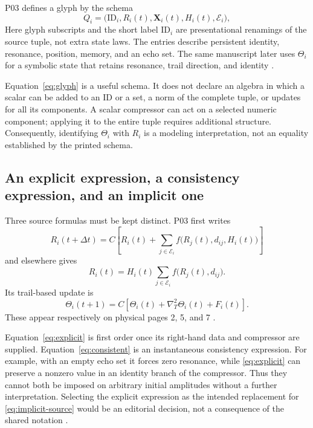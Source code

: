 \documentclass[11pt,a4paper]{article}
\theoremstyle{definition}
\numberwithin{equation}{section}
\begin{document}
P03 defines a glyph by the schema
\begin{equation}
 Q_i=\bigl(\mathrm{ID}_i,R_i(t),\mathbf X_i(t),H_i(t),\mathcal E_i\bigr),
 \label{eq:glyph}
\end{equation}
Here glyph subscripts and the short label $\mathrm{ID}_i$ are presentational
renamings of the source tuple, not extra state laws. The entries describe
persistent identity, resonance, position, memory,
and an echo set. The same manuscript later uses $\Theta_i$ for a symbolic
state that retains resonance, trail direction, and identity
\cite[physical pp.~2,18]{P03}.

Equation~\eqref{eq:glyph} is a useful schema. It does not declare an algebra
in which a scalar can be added to an ID or a set, a norm of the complete tuple,
or updates for all its components. A scalar compressor can act on a selected
numeric component; applying it to the entire tuple requires additional
structure. Consequently, identifying $\Theta_i$ with $R_i$ is a modeling
interpretation, not an equality established by the printed schema.

\subsection{An explicit expression, a consistency expression, and an implicit one}

Three source formulas must be kept distinct. P03 first writes
\begin{equation}
 R_i(t+\Delta t)=C\!\left[R_i(t)+
 \sum_{j\in\mathcal E_i}f\bigl(R_j(t),d_{ij},H_i(t)\bigr)\right]
 \label{eq:explicit}
\end{equation}
and elsewhere gives
\begin{equation}
 R_i(t)=H_i(t)\sum_{j\in\mathcal E_i}f\bigl(R_j(t),d_{ij}\bigr).
 \label{eq:consistent}
\end{equation}
Its trail-based update is
\begin{equation}
 \Theta_i(t+1)=C\!\left[
 \Theta_i(t)+\nabla_T^2\Theta_i(t)+F_i(t)\right].
 \label{eq:implicit-source}
\end{equation}
These appear respectively on physical pages 2, 5, and 7
\cite[\S\S1.1,2.2,3.1]{P03}.

Equation~\eqref{eq:explicit} is first order once its right-hand data and
compressor are supplied. Equation~\eqref{eq:consistent} is an instantaneous
consistency expression. For example, with an empty echo set it forces zero
resonance, while \eqref{eq:explicit} can preserve a nonzero value in an
identity branch of the compressor. Thus they cannot both be imposed on
arbitrary initial amplitudes without a further interpretation. Selecting the
explicit expression as the intended replacement for
\eqref{eq:implicit-source} would be an editorial decision, not a consequence
of the shared notation \cite[\S\S2.1,3.4]{F01}.
\end{document}
